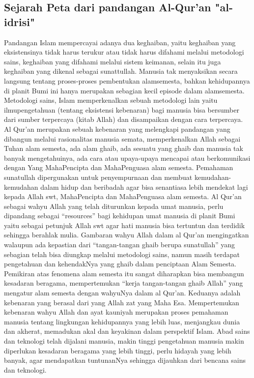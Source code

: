 \subsection {Sejarah Peta dari pandangan Al-Qur'an "al-idrisi"}
	Pandangan Islam mempercayai adanya dua keghaiban, yaitu keghaiban yang eksistensinya tidak harus terukur atau tidak harus difahami melalui metodologi sains, keghaiban yang difahami melalui sistem keimanan, selain itu juga keghaiban yang dikenal sebagai sunattullah. Manusia tak menyaksikan secara langsung tentang proses-proses pembentukan alamsemesta, bahkan kehidupannya di planit Bumi ini hanya merupakan sebagian kecil episode dalam alamsemesta.
	Metodologi sains, Islam memperkenalkan sebuah metodologi lain yaitu ilmupengetahuan (tentang eksistensi kebenaran) bagi manusia bisa bersumber dari sumber terpercaya (kitab Allah) dan disampaikan dengan cara terpercaya. Al Qur’an merupakan sebuah kebenaran yang melengkapi pandangan yang dibangun melalui rasionalitas manusia semata, memperkenalkan Allah sebagai Tuhan alam semesta, ada alam ghaib, ada sesuatu yang ghaib dan manusia tak banyak mengetahuinya, ada cara atau upaya-upaya mencapai atau berkomunikasi dengan Yang MahaPencipta dan MahaPenguasa alam semesta. Pemahaman sunatullah dipergunakan untuk penyempurnaan dan membuat kemudahan-kemudahan dalam hidup dan beribadah agar bisa senantiasa lebih mendekat lagi kepada Allah swt, MahaPencipta dan MahaPenguasa alam semesta.
	Al Qur’an sebagai wahyu Allah yang telah diturunkan kepada umat manusia, perlu dipandang sebagai “resources” bagi kehidupan umat manusia di planit Bumi yaitu sebagai petunjuk Allah swt agar hati manusia bisa tertuntun dan terdidik sehingga berahlak mulia. Gambaran wahyu Allah dalam al Qur'an mengingatkan walaupun ada kepastian dari “tangan-tangan ghaib berupa sunatullah” yang sebagian telah bisa diungkap melalui metodologi sains, namun masih terdapat pengetahuan dan kehendakNya yang ghaib dalam penciptaan Alam Semesta. 
	Pemikiran atas fenomena alam semesta itu sangat diharapkan bisa membangun kesadaran beragama, mempertemukan “kerja tangan-tangan ghaib Allah” yang mengatur alam semesta dengan wahyuNya dalam al Qur’an. Keduanya adalah kebenaran yang berasal dari yang Allah zat yang Maha Esa. Mempertemukan kebenaran wahyu Allah dan ayat kauniyah merupakan proses pemahaman manusia tentang lingkungan kehidupannya yang lebih luas, menjangkau dunia dan akherat, memadukan akal dan keyakinan dalam perspektif Islam. 
	Abad sains dan teknologi telah dijalani manusia, makin tinggi pengetahuan manusia makin diperlukan kesadaran beragama yang lebih tinggi, perlu hidayah yang lebih banyak, agar mendapatkan tuntunanNya sehingga dijauhkan dari bencana sains dan teknologi. 
